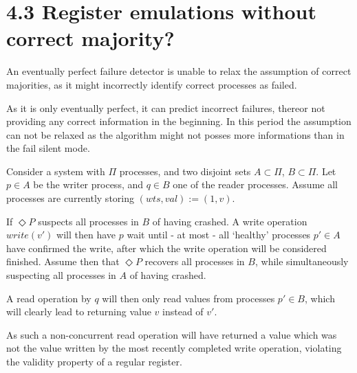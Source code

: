 \documentclass{article}
\begin{document}
    \section*{4.3 Register emulations without correct majority?}

    An eventually perfect failure detector is unable to relax the assumption of
    correct majorities, as it might incorrectly identify correct processes as
    failed.

    As it is only eventually perfect, it can predict incorrect failures, thereor not providing any correct information in the beginning.
    In this period the assumption can not be relaxed as the algorithm might not posses more informations than in the fail silent mode.

    Consider a system with $\Pi$ processes, and two disjoint sets $A \subset \Pi$,
    $B \subset \Pi$. Let $p \in A$ be the writer process, and $q \in B$ one of the
    reader processes. Assume all processes are currently storing $(wts, val) := (1,
    v)$.

    If $\Diamond P$ suspects all processes in $B$ of having crashed. A
    write operation $write(v')$ will then have $p$ wait until - at most - all
    `healthy' processes $p' \in A$ have confirmed the write, after which the write
    operation will be considered finished. Assume then that $\Diamond P$ recovers
    all processes in $B$, while simultaneously suspecting all processes in $A$ of
    having crashed.

    A read operation by $q$ will then only read values from processes $p' \in B$,
    which will clearly lead to returning value $v$ instead of $v'$.

    As such a non-concurrent read operation will have returned a value which was
    not the value written by the most recently completed write operation, violating
    the validity property of a regular register.
\end{document}

